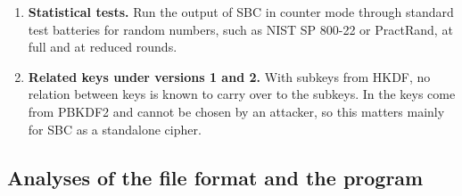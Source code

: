 \begin{enumerate}
\item \textbf{Statistical tests.} Run the output of SBC in counter mode
      through standard test batteries for random numbers, such as NIST SP
      800-22 or PractRand, at full and at reduced rounds.

\item \textbf{Related keys under versions 1 and 2.} With subkeys from HKDF, no
      relation between keys is known to carry over to the subkeys. In
       the keys come from PBKDF2 and cannot be chosen by an
      attacker, so this matters mainly for SBC as a standalone cipher.
\end{enumerate}

\subsection{Analyses of the file format and the program}

